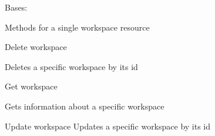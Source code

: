 \documentclass[letterpaper,10pt,english]{sphinxmanual}
\begin{document}
\begin{fulllineitems}
\label{_source/son_editor.apis:son_editor.apis.workspacesapi.Workspace}
Bases: 

Methods for a single workspace resource

\begin{fulllineitems}
\label{_source/son_editor.apis:son_editor.apis.workspacesapi.Workspace.delete}
Delete workspace

Deletes a specific workspace by its id

\end{fulllineitems}


\begin{fulllineitems}
\label{_source/son_editor.apis:son_editor.apis.workspacesapi.Workspace.get}
Get workspace

Gets information about a specific workspace

\end{fulllineitems}


\begin{fulllineitems}
\label{_source/son_editor.apis:son_editor.apis.workspacesapi.Workspace.methods}
\end{fulllineitems}


\begin{fulllineitems}
\label{_source/son_editor.apis:son_editor.apis.workspacesapi.Workspace.put}
Update workspace
Updates a specific workspace by its id

\end{fulllineitems}


\end{fulllineitems}
\end{document}
